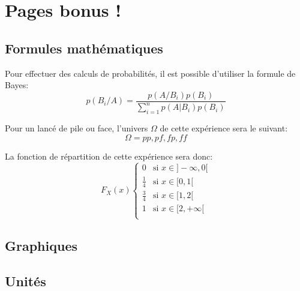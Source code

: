 \chapter{Pages bonus !}

	\section{Formules mathématiques}
	
		Pour effectuer des calculs de probabilités, il est possible d'utiliser la formule de Bayes:
		\begin{equation}
			p(B_i/A)=\frac{p(A/B_i)p(B_i)}{\sum_{i=1}^{n}p(A|B_i)p(B_i)}
		\end{equation}
		
		Pour un lancé de \og pile ou face\fg{}, l'univers $ \Omega $ de cette expérience sera le suivant:
		\[\Omega={pp, pf, fp, ff}\]
		
		La fonction de répartition de cette expérience sera donc:
		\[ 
			F_X(x)
			\begin{cases}
				0 & \text{si } x \in ]-\infty,0[ \\
				\frac{1}{4} & \text{si } x \in [0,1[ \\
				\frac{3}{4} & \text{si } x \in [1,2[ \\
				1 & \text{si } x \in [2,+\infty[ \\
			\end{cases}
		\]
	
	\section{Graphiques}
	
		
	
	\section{Unités}
	
